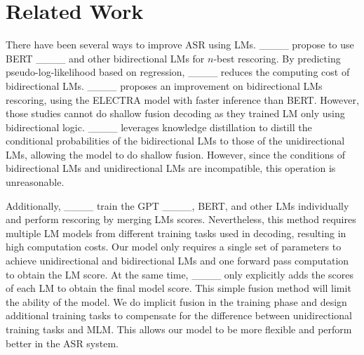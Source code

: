 \section{Related Work}
There have been several ways to improve ASR using LMs. ____ propose to use BERT ____ and other bidirectional LMs for $n$-best rescoring. By predicting pseudo-log-likelihood based on regression, ____ reduces the computing cost of bidirectional LMs. ____ proposes an improvement on bidirectional LMs rescoring, using the ELECTRA model with faster inference than BERT. However, those studies cannot do shallow fusion decoding as they trained LM only using bidirectional logic. ____ leverages knowledge distillation to distill the conditional probabilities of the bidirectional LMs to those of the unidirectional LMs, allowing the model to do shallow fusion. However, since the conditions of bidirectional LMs and unidirectional LMs are incompatible, this operation is unreasonable.


Additionally, ____ train the GPT ____, BERT, and other LMs individually and perform rescoring by merging LMs scores. Nevertheless, this method requires multiple LM models from different training tasks used in decoding, resulting in high computation costs. Our model only requires a single set of parameters to achieve unidirectional and bidirectional LMs and one forward pass computation to obtain the LM score. At the same time, ____ only explicitly adds the scores of each LM to obtain the final model score. This simple fusion method will limit the ability of the model. We do implicit fusion in the training phase and design additional training tasks to compensate for the difference between unidirectional training tasks and MLM. This allows our model to be more flexible and perform better in the ASR system.